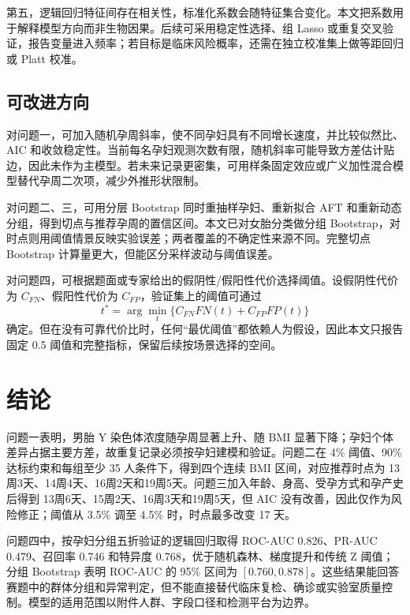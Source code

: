 \documentclass[UTF8,a4paper,12pt]{ctexart}
\begin{document}
第五，逻辑回归特征间存在相关性，标准化系数会随特征集合变化。本文把系数用于解释模型方向而非生物因果。后续可采用稳定性选择、组 Lasso 或重复交叉验证，报告变量进入频率；若目标是临床风险概率，还需在独立校准集上做等距回归或 Platt 校准。

\subsection{可改进方向}

对问题一，可加入随机孕周斜率，使不同孕妇具有不同增长速度，并比较似然比、AIC 和收敛稳定性。当前每名孕妇观测次数有限，随机斜率可能导致方差估计贴边，因此未作为主模型。若未来记录更密集，可用样条固定效应或广义加性混合模型替代孕周二次项，减少外推形状限制。

对问题二、三，可用分层 Bootstrap 同时重抽样孕妇、重新拟合 AFT 和重新动态分组，得到切点与推荐孕周的置信区间。本文已对女胎分类做分组 Bootstrap，对时点则用阈值情景反映实验误差；两者覆盖的不确定性来源不同。完整切点 Bootstrap 计算量更大，但能区分采样波动与阈值误差。

对问题四，可根据题面或专家给出的假阴性/假阳性代价选择阈值。设假阴性代价为 $C_{FN}$、假阳性代价为 $C_{FP}$，验证集上的阈值可通过
\begin{equation}
t^*=\arg\min_t\{C_{FN}FN(t)+C_{FP}FP(t)\}
\label{eq:costthreshold}
\end{equation}
确定。但在没有可靠代价比时，任何“最优阈值”都依赖人为假设，因此本文只报告固定 0.5 阈值和完整指标，保留后续按场景选择的空间。

\section{结论}

问题一表明，男胎 Y 染色体浓度随孕周显著上升、随 BMI 显著下降；孕妇个体差异占据主要方差，故重复记录必须按孕妇建模和验证。问题二在 4\% 阈值、90\% 达标约束和每组至少 35 人条件下，得到四个连续 BMI 区间，对应推荐时点为 13周3天、14周4天、16周2天和19周5天。问题三加入年龄、身高、受孕方式和孕产史后得到 13周6天、15周2天、16周3天和19周5天，但 AIC 没有改善，因此仅作为风险修正；阈值从 3.5\% 调至 4.5\% 时，时点最多改变 17 天。

问题四中，按孕妇分组五折验证的逻辑回归取得 ROC-AUC 0.826、PR-AUC 0.479、召回率 0.746 和特异度 0.768，优于随机森林、梯度提升和传统 Z 阈值；分组 Bootstrap 表明 ROC-AUC 的 95\% 区间为 $[0.760,0.878]$。这些结果能回答赛题中的群体分组和异常判定，但不能直接替代临床复检、确诊或实验室质量控制。模型的适用范围以附件人群、字段口径和检测平台为边界。
\end{document}
